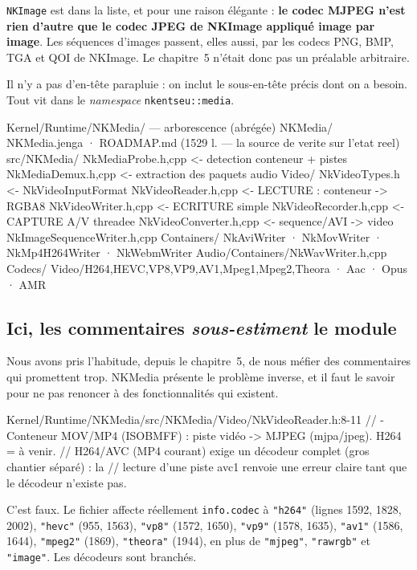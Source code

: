 \texttt{NKImage} est dans la liste, et pour une raison élégante : \textbf{le
codec MJPEG n'est rien d'autre que le codec JPEG de NKImage appliqué image par
image}. Les séquences d'images passent, elles aussi, par les codecs PNG, BMP,
TGA et QOI de NKImage. Le chapitre~5 n'était donc pas un préalable arbitraire.

Il n'y a pas d'en-tête parapluie : on inclut le sous-en-tête précis dont on a
besoin. Tout vit dans le \emph{namespace} \texttt{nkentseu::media}.

\begin{nkcode}{Kernel/Runtime/NKMedia/ — arborescence (abrégée)}
NKMedia/
  NKMedia.jenga · ROADMAP.md (1529 l. — la source de verite sur l'etat reel)
  src/NKMedia/
    NkMediaProbe.{h,cpp}        <- detection conteneur + pistes
    NkMediaDemux.{h,cpp}        <- extraction des paquets audio
    Video/
      NkVideoTypes.h            <- NkVideoInputFormat
      NkVideoReader.{h,cpp}     <- LECTURE : conteneur -> RGBA8
      NkVideoWriter.{h,cpp}     <- ECRITURE simple
      NkVideoRecorder.{h,cpp}   <- CAPTURE A/V threadee
      NkVideoConverter.{h,cpp}  <- sequence/AVI -> video
      NkImageSequenceWriter.{h,cpp}
      Containers/ NkAviWriter · NkMovWriter · NkMp4H264Writer · NkWebmWriter
    Audio/Containers/NkWavWriter.{h,cpp}
    Codecs/ Video/{H264,HEVC,VP8,VP9,AV1,Mpeg1,Mpeg2,Theora} · Aac · Opus · AMR
\end{nkcode}

\subsection{Ici, les commentaires \emph{sous-estiment} le module}

Nous avons pris l'habitude, depuis le chapitre~5, de nous méfier des
commentaires qui promettent trop. NKMedia présente le problème inverse, et il
faut le savoir pour ne pas renoncer à des fonctionnalités qui existent.

\begin{nkcode}{Kernel/Runtime/NKMedia/src/NKMedia/Video/NkVideoReader.h:8-11}
//   - Conteneur MOV/MP4 (ISOBMFF) : piste vidéo -> MJPEG (mjpa/jpeg). H264 = à venir.
// H264/AVC (MP4 courant) exige un décodeur complet (gros chantier séparé) : la
// lecture d'une piste avc1 renvoie une erreur claire tant que le décodeur n'existe pas.
\end{nkcode}

C'est faux. Le fichier  affecte réellement
\texttt{info.codec} à \texttt{"h264"} (lignes 1592, 1828, 2002), \texttt{"hevc"}
(955, 1563), \texttt{"vp8"} (1572, 1650), \texttt{"vp9"} (1578, 1635),
\texttt{"av1"} (1586, 1644), \texttt{"mpeg2"} (1869), \texttt{"theora"} (1944),
en plus de \texttt{"mjpeg"}, \texttt{"rawrgb"} et \texttt{"image"}. Les
décodeurs sont branchés.

